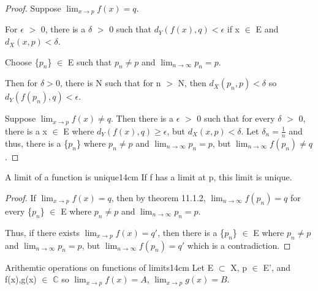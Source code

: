     \begin{proof}
        Suppose $\lim_{x \rightarrow p} f(x) = q$.

        For $\epsilon$ $>$ 0, there is a $\delta$ $>$ 0 such that
        $d_Y(f(x),q) < \epsilon$ if x $\in$ E and $d_X(x,p) < \delta$.

        Choose \{$p_n$\} $\in$ E such that $p_n \not = p$
        and $\lim_{n \rightarrow \infty} p_n = p$.

        Then for $\delta > 0$, there is N such that for n $>$ N, then
        $d_X(p_n,p)< \delta$ so $d_Y(f(p_n),q) < \epsilon$.

        \vspace{0.2cm}

        Suppose $\lim_{x \rightarrow p} f(x) \not = q$.
        Then there is a $\epsilon$ $>$ 0 such that for every $\delta$ $>$ 0,
        there is a x $\in$ E where $d_Y(f(x),q) \geq \epsilon$, but
        $d_X(x,p) < \delta$.
        Let $\delta_n = \frac{1}{n}$ and thus, there is a \{$p_n$\}
        where $p_n \not = p$ and $\lim_{n \rightarrow \infty} p_n = p$,
        but $\lim_{n \rightarrow \infty} f(p_n) \not = q$.
    \end{proof}

    \vspace{0.5cm}



    \begin{corollary}{A limit of a function is unique}{14cm}
        If f has a limit at p, this limit is unique.
    \end{corollary}

    \begin{proof}
        If $\lim_{x \rightarrow p} f(x) = q$, then by {\color{red} theorem 11.1.2},
        $\lim_{n \rightarrow \infty} f(p_n) = q$ for every
        \{$p_n$\} $\in$ E where $p_n \not = p$ and
        $\lim_{n \rightarrow \infty} p_n = p$.

        Thus, if there exists $\lim_{x \rightarrow p} f(x) = q'$, then there is
        a \{$p_n$\} $\in$ E where $p_n \not = p$ and
        $\lim_{n \rightarrow \infty} p_n = p$, but
        $\lim_{n \rightarrow \infty} f(p_n) = q'$ which is a contradiction.
    \end{proof}

    \vspace{0.5cm}



    \begin{wtheorem}{Arithemtic operations on functions of limits}{14cm}
        Let E $\subset$ X, p $\in$ E', and f(x),g(x) $\in$ $\mathbb{C}$ so 
        $\lim_{x \rightarrow p} f(x) = A$, $\lim_{x \rightarrow p} g(x) = B$.
    \end{wtheorem}

